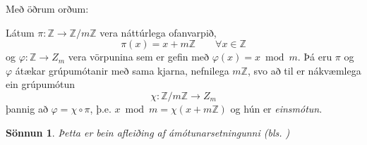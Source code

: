 \documentclass[a4paper,icelandic,11pt]{book}
\theoremstyle{plain}
\newtheorem*{sonnun}{Sönnun}
\newcommand{\Z}{\mathbb{Z}}
\begin{document}
Með öðrum orðum:
\begin{setn}
  Látum $\pi:\Z\to\Z/m\Z$ vera náttúrlega ofanvarpið,
  \begin{equation*}
    \pi(x) = x + m\Z
    \qquad
    \forall x\in\Z
  \end{equation*}
  og $\varphi:\Z\to Z_m$ vera vörpunina sem er gefin með $\varphi(x) = x\bmod
  m$. Þá eru $\pi$ og $\varphi$ átækar grúpumótanir með sama kjarna, nefnilega
  $m\Z$, svo að til er nákvæmlega ein grúpumótun
  \begin{equation*}
    \chi:\Z/m\Z \to Z_m
  \end{equation*}
  þannig að $\varphi = \chi\circ\pi$, þ.e. $x\bmod m = \chi(x+m\Z)$ og hún er
  \emph{einsmótun}.
\end{setn}
\begin{sonnun}
  Þetta er bein afleiðing af \emph{ámótunarsetningunni} (bls.
  \pageref{setn:amotun})
\end{sonnun}
\end{document}
